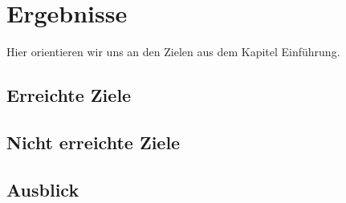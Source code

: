 \chapter{Ergebnisse}
    Hier orientieren wir uns an den Zielen aus dem Kapitel Einführung.
	\section{Erreichte Ziele}
	
	\section{Nicht erreichte Ziele}
	
	
	\section{Ausblick}